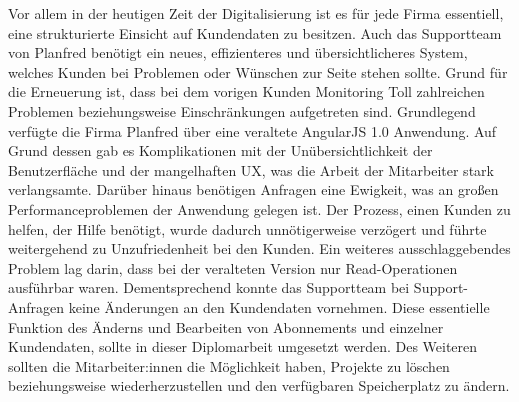Vor allem in der heutigen Zeit der Digitalisierung ist es für jede Firma essentiell, eine strukturierte Einsicht auf Kundendaten zu besitzen. Auch das Supportteam von Planfred benötigt ein neues, effizienteres und übersichtlicheres System, welches Kunden bei Problemen oder Wünschen zur Seite stehen sollte. Grund für die Erneuerung ist, dass bei dem vorigen Kunden Monitoring Toll zahlreichen Problemen beziehungsweise Einschränkungen aufgetreten sind.
\newline
Grundlegend verfügte die Firma Planfred über eine veraltete AngularJS 1.0 Anwendung. Auf Grund dessen gab es Komplikationen mit der Unübersichtlichkeit der Benutzerfläche und der mangelhaften UX, was die Arbeit der Mitarbeiter stark verlangsamte. Darüber hinaus benötigen Anfragen eine Ewigkeit, was an großen Performanceproblemen der Anwendung gelegen ist. Der Prozess, einen Kunden zu helfen, der Hilfe benötigt, wurde dadurch unnötigerweise verzögert und führte weitergehend zu Unzufriedenheit bei den Kunden.
\newline
Ein weiteres ausschlaggebendes Problem lag darin, dass bei der veralteten Version nur Read-Operationen ausführbar waren. Dementsprechend konnte das Supportteam bei Support-Anfragen keine Änderungen an den Kundendaten vornehmen. Diese essentielle Funktion des Änderns und Bearbeiten von Abonnements und einzelner Kundendaten, sollte in dieser Diplomarbeit umgesetzt werden. Des Weiteren sollten die Mitarbeiter:innen die Möglichkeit haben, Projekte zu löschen beziehungsweise wiederherzustellen und den verfügbaren Speicherplatz zu ändern.